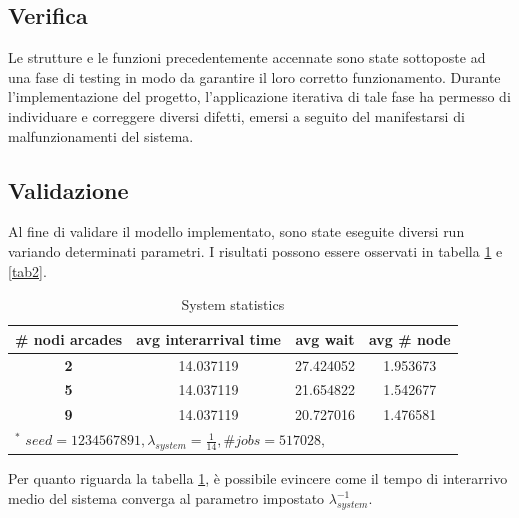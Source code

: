 \documentclass{article}
\begin{document}
\subsection{Verifica}
Le strutture e le funzioni precedentemente accennate sono state sottoposte ad una fase di testing in modo da garantire il loro corretto funzionamento. Durante l'implementazione del progetto, l'applicazione iterativa di tale fase ha permesso di individuare e correggere diversi difetti, emersi a seguito del manifestarsi di malfunzionamenti del sistema.

\subsection{Validazione}
Al fine di validare il modello implementato, sono state eseguite diversi run variando determinati parametri. I risultati possono essere osservati in tabella \ref{tab1} e \ref{tab2}.

\begin{table}[htbp]
\caption{System statistics}
\begin{center}
\begin{tabular}{|c|c|c|c|}
\hline
\textbf{\# nodi arcades} & \textbf{avg interarrival time} & \textbf{avg wait} & \textbf{avg \# node} \\ \hline
\textbf{2} & 14.037119 & 27.424052 & 1.953673 \\ \hline
\textbf{5} & 14.037119 & 21.654822 & 1.542677 \\ \hline
\textbf{9} & 14.037119 &  20.727016 & 1.476581 \\ \hline
\multicolumn{4}{l}{$^{\mathrm{*}}$ $seed=1234567891, \lambda_{system} =\frac{1}{14} , \# jobs=517028, $}
\end{tabular}
\label{tab1}
\end{center}
\end{table}

Per quanto riguarda la tabella \ref{tab1}, è possibile evincere come il tempo di interarrivo medio del sistema converga al parametro impostato $\lambda_{system}^{-1}$.
\end{document}
